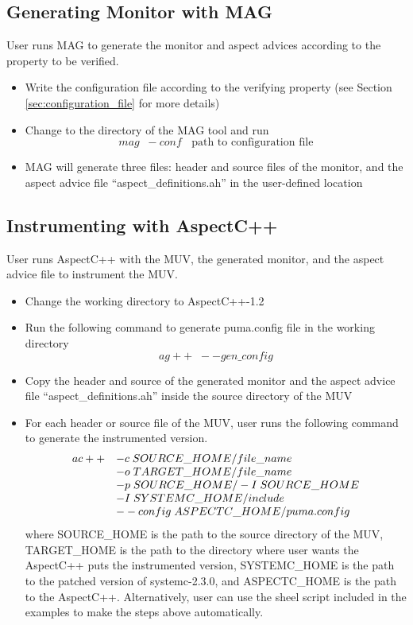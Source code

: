 \documentclass{llncs}
\begin{document}
\subsection{Generating Monitor with MAG}
User runs MAG to generate the monitor and aspect advices according to the property to be verified.
\begin{itemize}
\item Write the configuration file according to the verifying property (see Section \ref{sec:configuration_file} for more details)
\item Change to the directory of the MAG tool and run 
\begin{displaymath}
mag \; \; -conf \; \; \text{ path to configuration file}
\end{displaymath}
\item MAG will generate three files: header and source files of the monitor, and the aspect advice file ``aspect\_definitions.ah'' in the user-defined location
\end{itemize}
\subsection{Instrumenting with AspectC++}
User runs AspectC++ with the MUV, the generated monitor, and the aspect advice file to instrument the MUV.
\begin{itemize}
\item Change the working directory to AspectC++-1.2
\item Run the following command to generate puma.config file in the working directory
\begin{displaymath}
ag++ \; \; --gen\_config
\end{displaymath}
\item Copy the header and source of the generated monitor and the aspect advice file ``aspect\_definitions.ah'' inside the source directory of the MUV
\item For each header or source file of the MUV, user runs the following command to generate the instrumented version.
\begin{displaymath}
\begin{array}{l l}
ac++ & -c \; SOURCE\_HOME/file\_name\\
       & -o \; TARGET\_HOME/file\_name\\
       & -p \; SOURCE\_HOME/ -I \; SOURCE\_HOME\\
       & -I \; SYSTEMC\_HOME/include\\
       & --config \; ASPECTC\_HOME/puma.config
\end{array}
\end{displaymath}
where SOURCE\_HOME is the path to the source directory of the MUV, TARGET\_HOME is the path to the directory where user wants the AspectC++ puts the instrumented version, SYSTEMC\_HOME is the path to the patched version of systemc-2.3.0, and ASPECTC\_HOME is the path to the AspectC++. Alternatively, user can use the sheel script included in the examples to make the steps above automatically.
\end{itemize}
\end{document}
